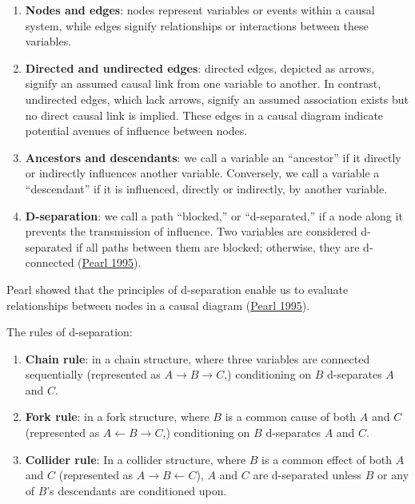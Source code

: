 \documentclass[
  singlecolumn]{article}
\begin{document}
\begin{enumerate}
\def\labelenumi{\arabic{enumi}.}
\item
  \textbf{Nodes and edges}: nodes represent variables or events within a
  causal system, while edges signify relationships or interactions
  between these variables.
\item
  \textbf{Directed and undirected edges}: directed edges, depicted as
  arrows, signify an assumed causal link from one variable to another.
  In contrast, undirected edges, which lack arrows, signify an assumed
  association exists but no direct causal link is implied. These edges
  in a causal diagram indicate potential avenues of influence between
  nodes.
\item
  \textbf{Ancestors and descendants}: we call a variable an ``ancestor''
  if it directly or indirectly influences another variable. Conversely,
  we call a variable a ``descendant'' if it is influenced, directly or
  indirectly, by another variable.
\item
  \textbf{D-separation}: we call a path ``blocked,'' or ``d-separated,''
  if a node along it prevents the transmission of influence. Two
  variables are considered d-separated if all paths between them are
  blocked; otherwise, they are d-connected
  (\protect\hyperlink{ref-pearl1995}{Pearl 1995}).
\end{enumerate}

Pearl showed that the principles of d-separation enable us to evaluate
relationships between nodes in a causal diagram
(\protect\hyperlink{ref-pearl1995}{Pearl 1995}).

The rules of d-separation:

\begin{enumerate}
\def\labelenumi{\alph{enumi}.}
\item
  \textbf{Chain rule}: in a chain structure, where three variables are
  connected sequentially (represented as
  \(A \rightarrow B \rightarrow C\),) conditioning on \(B\) d-separates
  \(A\) and \(C\).
\item
  \textbf{Fork rule}: in a fork structure, where \(B\) is a common cause
  of both \(A\) and \(C\) (represented as
  \(A \leftarrow B \rightarrow C\),) conditioning on \(B\) d-separates
  \(A\) and \(C\).
\item
  \textbf{Collider rule}: In a collider structure, where \(B\) is a
  common effect of both \(A\) and \(C\) (represented as
  \(A \rightarrow B \leftarrow C\)), \(A\) and \(C\) are d-separated
  unless \(B\) or any of \(B\)'s descendants are conditioned upon.
\end{enumerate}
\end{document}
